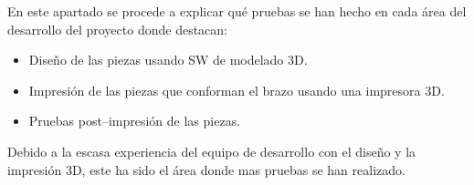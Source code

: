 En este apartado se procede a explicar qué pruebas se han hecho en cada área del desarrollo del proyecto donde destacan:
\begin{itemize}
    \item Diseño de las piezas usando \ac{SW} de modelado 3D.
    \item Impresión de las piezas que conforman el brazo usando una impresora 3D.
    \item Pruebas post--impresión de las piezas.
\end{itemize}

Debido a la escasa experiencia del equipo de desarrollo con el diseño y la impresión 3D, este ha sido el área donde mas pruebas se han realizado. 